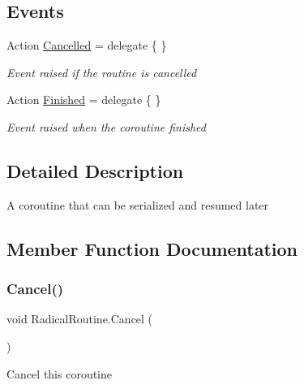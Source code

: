 \subsection*{Events}
\begin{DoxyCompactItemize}
\item 
Action \hyperlink{class_radical_routine_ad10d1a30c327b9c8613b10c7a274a57e}{Cancelled} = delegate \{ \}
\begin{DoxyCompactList}\small\item\em Event raised if the routine is cancelled \end{DoxyCompactList}\item 
Action \hyperlink{class_radical_routine_a4c372aa10c0c69be8156aa821ec7dd46}{Finished} = delegate \{ \}
\begin{DoxyCompactList}\small\item\em Event raised when the coroutine finished \end{DoxyCompactList}\end{DoxyCompactItemize}


\subsection{Detailed Description}
A coroutine that can be serialized and resumed later 



\subsection{Member Function Documentation}
\mbox{\label{class_radical_routine_ae628b04cef3d0780dcbef12be3d910a0}} 
\subsubsection{\texorpdfstring{Cancel()}{Cancel()}}
{\footnotesize\ttfamily void Radical\+Routine.\+Cancel (\begin{DoxyParamCaption}{ }\end{DoxyParamCaption})\hspace{0.3cm}{\ttfamily [inline]}}



Cancel this coroutine 

\mbox{\label{class_radical_routine_ac6e7a37c8a2b76dde3bbaf486faffd4b}} 
